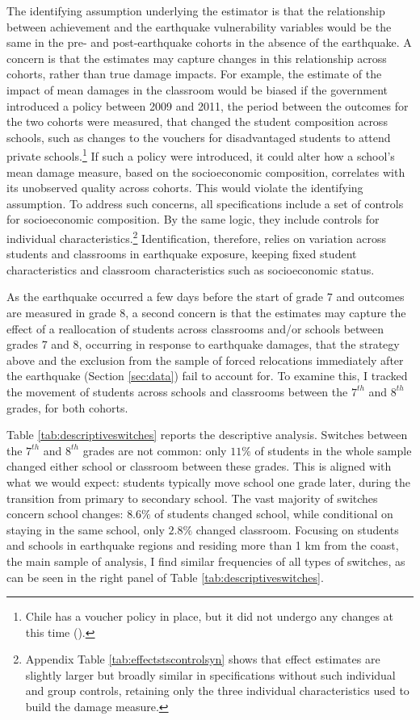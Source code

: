   The identifying assumption underlying the estimator is that the relationship between achievement and the earthquake vulnerability variables would be the same in the pre- and post-earthquake cohorts in the absence of the earthquake. A concern is that the estimates may capture changes in this relationship across cohorts, rather than true damage impacts. For example, the estimate of the impact of mean damages in the classroom would be biased if the government introduced a policy between 2009 and 2011, the period between the outcomes for the two cohorts were measured, that changed the student composition across schools, such as changes to the vouchers for disadvantaged students to attend private schools.\footnote{Chile has a voucher policy in place, but it did not undergo any changes at this time (\cite{neilson2021targeted}).} If such a policy were introduced, it could alter how a school's mean damage measure, based on the socioeconomic composition, correlates with its unobserved quality across cohorts. This would violate the identifying assumption. To address such concerns, all specifications include a set of controls for socioeconomic composition. By the same logic, they include controls for individual characteristics.\footnote{Appendix Table \ref{tab:effectstscontrolsyn} shows that effect estimates are slightly larger but broadly similar in specifications without such individual and group controls, retaining only the three individual characteristics used to build the damage measure.} Identification, therefore, relies on variation across students and classrooms in earthquake exposure, keeping fixed student characteristics and classroom characteristics such as socioeconomic status.\par

As the earthquake occurred a few days before the start of grade 7 and outcomes are measured in grade 8, a second concern is that the estimates may capture the effect of a reallocation of students across classrooms and/or schools between grades 7 and 8, occurring in response to earthquake damages, that the strategy above and the exclusion from the sample of forced relocations immediately after the earthquake (Section \ref{sec:data}) fail to account for. To examine this, I tracked the movement of students across schools and classrooms between the $7^{th}$ and $8^{th}$ grades, for both cohorts.\par

Table \ref{tab:descriptiveswitches} reports the descriptive analysis. Switches between the $7^{th}$ and $8^{th}$ grades are not common: only $11\%$ of students in the whole sample changed either school or classroom between these grades. This is aligned with what we would expect: students typically move school one grade later, during the transition from primary to secondary school. The vast majority of switches concern school changes: $8.6\%$ of students changed school, while conditional on staying in the same school, only $2.8\%$ changed classroom. Focusing on students and schools in earthquake regions and residing more than 1 km from the coast, the main sample of analysis, I find similar frequencies of all types of switches, as can be seen in the right panel of Table  \ref{tab:descriptiveswitches}. \par 


